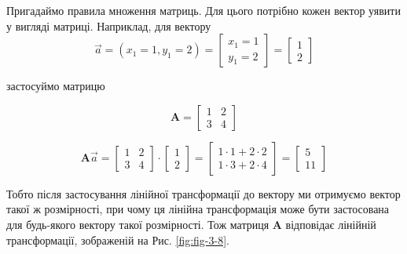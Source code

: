 \documentclass[
  11pt,
]{book}
\begin{document}
Пригадаймо правила множення матриць. Для цього потрібно кожен вектор уявити у вигляді матриці. Наприклад, для вектору \[\vec{a} = (x_1 = 1, y_1 = 2) = \begin{bmatrix} 
x_1 = 1 \\ 
y_1 = 2 \end{bmatrix} = \begin{bmatrix}
1 \\
2 \end{bmatrix}\]

застосуймо матрицю

\[\mathbf{A} = \begin{bmatrix}
1 & 2 \\
3 & 4
\end{bmatrix}\]

\[
\mathbf{A} \vec{a} = \begin{bmatrix}
1 & 2 \\
3 & 4
\end{bmatrix} \cdot \begin{bmatrix}
1 \\ 2 
\end{bmatrix}= \begin{bmatrix}
1 \cdot 1 + 2 \cdot 2 \\
1 \cdot 3 + 2 \cdot 4
\end{bmatrix} = \begin{bmatrix}
5 \\ 11
\end{bmatrix}
\]

Тобто після застосування лінійної трансформації до вектору ми отримуємо вектор такої ж розмірності, при чому ця лінійна трансформація може бути застосована для будь-якого вектору такої розмірності. Тож матриця \(\mathbf{A}\) відповідає лінійній трансформації, зображеній на Рис. \ref{fig:fig-3-8}.
\end{document}
